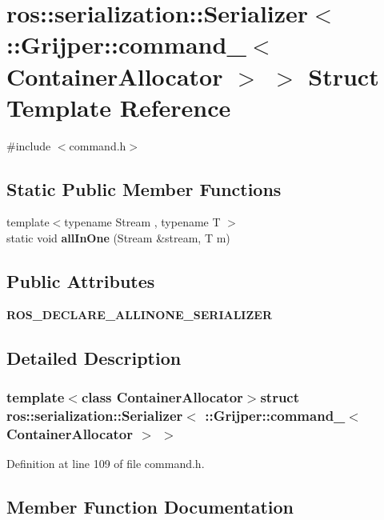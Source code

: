 \section{ros\-:\-:serialization\-:\-:Serializer$<$ \-:\-:Grijper\-:\-:command\-\_\-$<$ Container\-Allocator $>$ $>$ Struct Template Reference}
\label{structros_1_1serialization_1_1Serializer_3_01_1_1Grijper_1_1command___3_01ContainerAllocator_01_4_01_4}


{\ttfamily \#include $<$command.\-h$>$}

\subsection*{Static Public Member Functions}
\begin{DoxyCompactItemize}
\item 
{\footnotesize template$<$typename Stream , typename T $>$ }\\static void {\bf all\-In\-One} (Stream \&stream, T m)
\end{DoxyCompactItemize}
\subsection*{Public Attributes}
\begin{DoxyCompactItemize}
\item 
{\bf R\-O\-S\-\_\-\-D\-E\-C\-L\-A\-R\-E\-\_\-\-A\-L\-L\-I\-N\-O\-N\-E\-\_\-\-S\-E\-R\-I\-A\-L\-I\-Z\-E\-R}
\end{DoxyCompactItemize}


\subsection{Detailed Description}
\subsubsection*{template$<$class Container\-Allocator$>$struct ros\-::serialization\-::\-Serializer$<$ \-::\-Grijper\-::command\-\_\-$<$ Container\-Allocator $>$ $>$}



Definition at line 109 of file command.\-h.



\subsection{Member Function Documentation}
